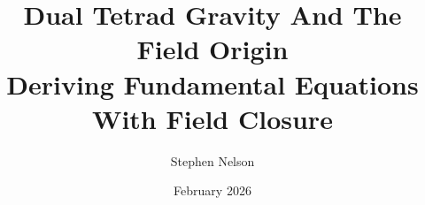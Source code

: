 \documentclass[aps,prd,preprint,superscriptaddress,showpacs,preprintnumbers,amsmath,amssymb,nofootinbib]{revtex4-2}
\begin{document}
\raggedbottom

\title{Dual Tetrad Gravity And The Field Origin\\
\large Deriving Fundamental Equations With Field Closure}

\author{Stephen Nelson}

\date{February 2026}

\end{document}
